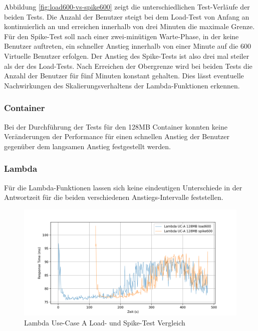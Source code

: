 Abbildung \ref{fig:load600-vs-spike600} zeigt die unterschiedlichen Test-Verläufe der beiden Tests. Die Anzahl der Benutzer steigt bei dem Load-Test von Anfang an kontinuierlich an und erreichen innerhalb von drei Minuten die maximale Grenze. Für den Spike-Test soll nach einer zwei-minütigen Warte-Phase, in der keine Benutzer auftreten, ein schneller Anstieg innerhalb von einer Minute auf die 600 Virtuelle Benutzer erfolgen. Der Anstieg des Spike-Tests ist also drei mal steiler als der des Load-Tests. 
Nach Erreichen der Obergrenze wird bei beiden Tests die Anzahl der Benutzer für fünf Minuten konstant gehalten. Dies lässt eventuelle Nachwirkungen des Skalierungsverhaltens der Lambda-Funktionen erkennen.


\subsubsection{Container}
Bei der Durchführung der Tests für den 128MB Container konnten keine Veränderungen der Performance für einen schnellen Anstieg der Benutzer gegenüber dem langsamen Anstieg festgestellt werden.

\subsubsection{Lambda}
Für die Lambda-Funktionen lassen sich keine eindeutigen Unterschiede in der Antwortzeit für die beiden verschiedenen Anstiegs-Intervalle feststellen. 


\begin{figure}[H]
    \includegraphics[width=\textwidth]{img/lambda-uca-load600-vs-spike600-example.png}
    \caption[Lambda Use-Case A Load- und Spike-Test Vergleich]{Lambda Use-Case A Load- und Spike-Test Vergleich}
    \label{fig:lambda-uca-load600-vs-spike600-example}
\end{figure}

